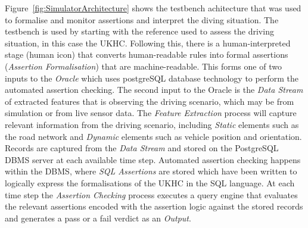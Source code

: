 Figure~\ref{fig:SimulatorArchitecture} shows the testbench achitecture that was used to formalise and monitor assertions and interpret the diving situation. The testbench is used by starting with the reference used to assess the driving situation, in this case the UKHC. Following this, there is a human-interpreted stage (human icon) that converts human-readable rules into formal assertions (\emph{Assertion Formalisation}) that are machine-readable. This forms one of two inputs to the \emph{Oracle} which uses postgreSQL database technology to perform the automated assertion checking. The second input to the Oracle is the \emph{Data Stream} of extracted features that is observing the driving scenario, which may be from simulation or from live sensor data. The \emph{Feature Extraction} process will capture relevant information from the driving scenario, including \emph{Static} elements such as the road network and \emph{Dynamic} elements such as vehicle position and orientation. Records are captured from the \emph{Data Stream} and stored on the PostgreSQL DBMS server at each available time step.
%
Automated assertion checking happens within the DBMS, where \emph{SQL Assertions} are stored which have been written to logically express the formalisations of the UKHC in the SQL language. At each time step the \emph{Assertion Checking} process executes a query engine that evaluates the relevant assertions encoded with the assertion logic against the stored records and generates a pass or a fail verdict as an \emph{Output}.




